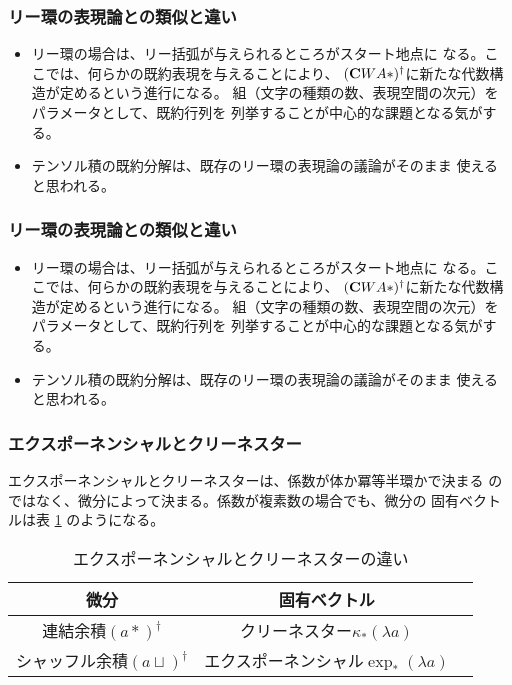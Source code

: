 		\subsubsection{リー環の表現論との類似と違い}\label{s3:リー環の表現論との類似と違い} %
			\begin{itemize}\setlength{\itemsep}{-1mm} %
				\item リー環の場合は、リー括弧が与えられるところがスタート地点に
				なる。ここでは、何らかの既約表現を与えることにより、
				$({\mathbf{C}}WA*)^\dag$に新たな代数構造が定めるという進行になる。
				組（文字の種類の数、表現空間の次元）をパラメータとして、既約行列を
				列挙することが中心的な課題となる気がする。
				\item テンソル積の既約分解は、既存のリー環の表現論の議論がそのまま
				使えると思われる。
			\end{itemize} %

		\subsubsection{リー環の表現論との類似と違い}\label{s3:リー環の表現論との類似と違い} %
			\begin{itemize}\setlength{\itemsep}{-1mm} %
				\item リー環の場合は、リー括弧が与えられるところがスタート地点に
				なる。ここでは、何らかの既約表現を与えることにより、
				$({\mathbf{C}}WA*)^\dag$に新たな代数構造が定めるという進行になる。
				組（文字の種類の数、表現空間の次元）をパラメータとして、既約行列を
				列挙することが中心的な課題となる気がする。
				\item テンソル積の既約分解は、既存のリー環の表現論の議論がそのまま
				使えると思われる。
			\end{itemize} %

		\subsubsection{エクスポーネンシャルとクリーネスター}\label{s3:エクスポーネンシャルとクリーネスター} %
			エクスポーネンシャルとクリーネスターは、係数が体か冪等半環かで決まる
			のではなく、微分によって決まる。係数が複素数の場合でも、微分の
			固有ベクトルは表
			\ref{tab:エクスポーネンシャルとクリーネスターの違い}
			のようになる。
			\begin{table}[htbp] %
				\begin{center}\begin{tabular}{ccc} \hline
					微分 & 固有ベクトル \\ \hline
					連結余積$(a*)^\dag$ & クリーネスター$\kappa_*(\lambda a)$ \\
					シャッフル余積$(a\sqcup)^\dag$ 
						& エクスポーネンシャル$\exp_*(\lambda a)$ \\
				\end{tabular}\end{center}
				\caption{エクスポーネンシャルとクリーネスターの違い}
				\label{tab:エクスポーネンシャルとクリーネスターの違い}
			\end{table} %

